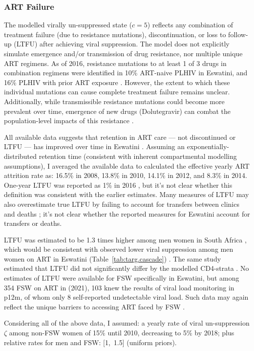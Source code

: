 \subsubsection{ART Failure}\label{model.par.cascade.fail}
The modelled virally un-suppressed state ($c=5$) reflects any combination of
treatment failure (\ie due to resistance mutations),
discontinuation, or loss to follow-up (LTFU) after achieving viral suppression.
The model does not explicitly simulate emergence and/or transmission of drug resistance,
nor multiple unique ART regimens.
As of 2016, resistance mutations to at least 1 of 3 drugs in combination regimens
were identified in 10\% ART-naive PLHIV in Eswatini,
and 16\% PLHIV with prior ART exposure \cite{WHO2021dr}.
However, the extent to which these individual mutations can cause
complete treatment failure remains unclear. %
Additionally, while transmissible resistance mutations could become more prevalent over time,
emergence of new drugs (\eg Dolutegravir)
can combat the population-level impacts of this resistance \cite{Hauser2019}.
\par
All available data suggests that retention in ART care
--- \ie not discontinued or LTFU ---
has improved over time in Eswatini \cite{NERCHA2014a,NERCHA2018a,SHIMS2}.
Assuming an exponentially-distributed retention time
(consistent with inherent compartmental modelling assumptions),
I averaged the available data \cite[Table~6]{NERCHA2018a}
to calculated the effective yearly ART attrition rate as:
16.5\% in 2008, 13.8\% in 2010, 14.1\% in 2012, and 8.3\% in 2014.
One-year LTFU was reported as 1\% in 2016 \cite{SHIMS2},
but it's not clear whether this definition was consistent with the earlier estimates.
Many measures of LTFU may also overestimate true LTFU
by failing to account for transfers between clinics and deaths \cite{Fox2018,Wilkinson2015};
it's not clear whether the reported measures for Eswatini account for transfers or deaths.
\par
LTFU was estimated to be 1.3 times higher among men \vs women in South Africa \cite{Fox2018},
which would be consistent with observed lower viral suppression among men \vs women on ART
in Eswatini (Table~\ref{tab:targ.cascade}) \cite{Fox2018}.
The same study estimated that LTFU did not significantly differ
by the modelled CD4-strata \cite{Fox2018}.
No estimates of LTFU were available for FSW specifically in Eswatini,
but among 354 FSW on ART in \cite{EswIBBS2022} (2021),
103 knew the results of viral load monitoring in p12m,
of whom only 8 self-reported undetectable viral load.
Such data may again reflect the unique barriers to accessing ART faced by FSW \cite{Lancaster2016}.
\par
Considering all of the above data, I assumed:
a yearly rate of viral un-suppression $\zeta$ among non-FSW women of
15\% until 2010, decreasing to 5\% by 2018;
plus relative rates for men and FSW: [1,~1.5] (uniform priors).
